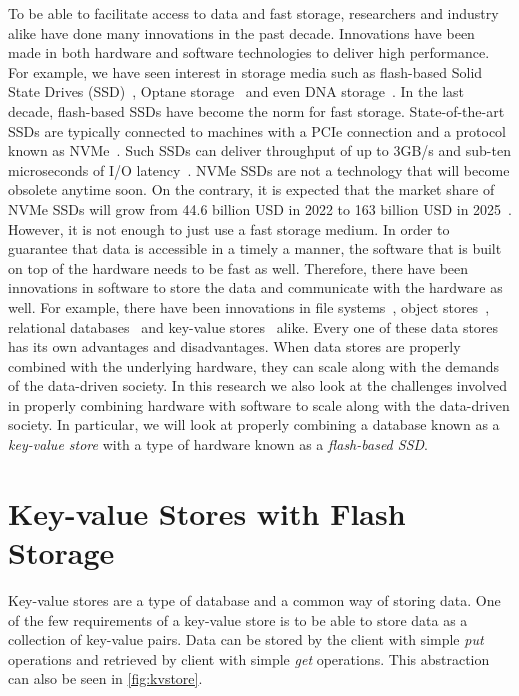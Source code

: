 To be able to facilitate access to data and fast storage, researchers and industry alike have done many innovations in the past decade. Innovations have been made in both hardware and software technologies to deliver high performance. For example, we have seen interest in storage media such as flash-based Solid State Drives (SSD)~\cite{doekemeijer2022key}, Optane storage~\cite{wu2019towards} and even DNA storage~\cite{li2020can}. In the last decade, flash-based SSDs have become the norm for fast storage. State-of-the-art SSDs are typically connected to machines with a PCIe connection and a protocol known as NVMe~\cite{lu2022nvme,xu2015performance,lee2019asynchronous}. Such SSDs can deliver throughput of up to 3GB/s and sub-ten microseconds of I/O latency~\cite{lee2019asynchronous}. NVMe SSDs are not a technology that will become obsolete anytime soon. On the contrary, it is expected that the market share of NVMe SSDs will grow from 44.6 billion USD in 2022 to 163 billion USD in 2025~\cite{2022expectednvme}. However, it is not enough to just use a fast storage medium. In order to guarantee that data is accessible in a timely a manner, the software that is built on top of the hardware needs to be fast as well. Therefore, there have been innovations in software to store the data and communicate with the hardware as well. For example, there have been innovations in file systems~\cite{lee2015f2fs,bjorling2021zns}, object stores~\cite{hwang2014heapo,macko2017smore}, relational databases~\cite{matsunobu2020myrocks,kang2014durable,cao2020polardb} and key-value stores~\cite{doekemeijer2022key} alike. Every one of these data stores has its own advantages and disadvantages. When data stores are properly combined with the underlying hardware, they can scale along with the demands of the data-driven society.  In this research we also look at the challenges involved in properly combining hardware with software to scale along with the data-driven society. In particular, we will look at properly combining a database known as a \textit{key-value store} with a type of hardware known as a \textit{flash-based SSD}.

\section{Key-value Stores with Flash Storage}
Key-value stores are a type of database and a common way of storing data. One of the few requirements of a key-value store is to be able to store data as a collection of key-value pairs. Data can be stored by the client with simple \textit{put} operations and retrieved by client with simple \textit{get} operations. This abstraction can also be seen in \autoref{fig:kvstore}.


